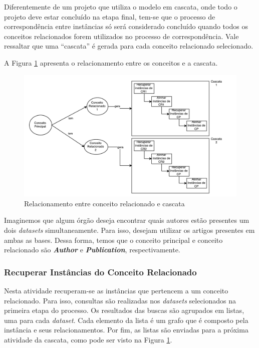 Diferentemente de um projeto que utiliza o modelo em cascata, onde todo o projeto deve estar concluído na etapa final, tem-se que o processo de correspondência entre instâncias só será considerado concluído quando todos os conceitos relacionados forem utilizados no processo de correspondência. Vale ressaltar que uma “cascata” é gerada para cada conceito relacionado selecionado. 

A Figura \ref{cp_cascata} apresenta o relacionamento entre os conceitos e a cascata.

\begin{figure}[!h]
	\centering
	\includegraphics[width=1\textwidth]{./imagens/CM_cascata.pdf}
	\caption{Relacionamento entre conceito relacionado e cascata}
	\label{cp_cascata}
\end{figure}

Imaginemos que algum órgão deseja encontrar quais autores estão presentes um dois \textit{datasets} simultaneamente. Para isso, desejam utilizar os artigos presentes em ambas as bases. Dessa forma, temos que o conceito principal e conceito relacionado são \textbf{\textit{Author}} e \textbf{\textit{Publication}}, respectivamente.

\subsubsection{Recuperar Instâncias do Conceito Relacionado}
\label{recuperao_relacionado}
Nesta atividade recuperam-se as instâncias que pertencem a um conceito relacionado. Para isso, consultas são realizadas nos \textit{datasets} selecionados na primeira etapa do processo.  Os resultados das buscas são agrupados em listas, uma para cada \textit{dataset}. Cada elemento da lista é um grafo que é composto pela instância e seus relacionamentos. Por fim, as listas são enviadas para a próxima atividade da cascata, como pode ser visto na Figura \ref{cp_cascata}.

